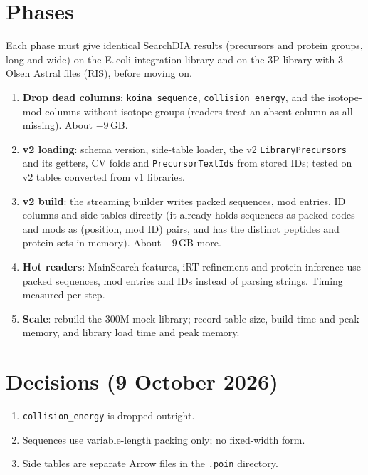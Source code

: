 \documentclass[10pt]{article}
\newcommand{\code}[1]{\texttt{#1}}
\begin{document}
\section{Phases}
Each phase must give identical SearchDIA results (precursors and protein groups, long and wide) on the E.\,coli
integration library and on the 3P library with 3 Olsen Astral files (RIS), before moving on.
\begin{enumerate}
\item \textbf{Drop dead columns}: \code{koina\_sequence}, \code{collision\_energy}, and the isotope-mod columns
  without isotope groups (readers treat an absent column as all missing). About $-9$\,GB.
\item \textbf{v2 loading}: schema version, side-table loader, the v2 \code{LibraryPrecursors} and its getters, CV
  folds and \code{PrecursorTextIds} from stored IDs; tested on v2 tables converted from v1 libraries.
\item \textbf{v2 build}: the streaming builder writes packed sequences, mod entries, ID columns and side tables
  directly (it already holds sequences as packed codes and mods as (position, mod ID) pairs, and has the distinct peptides
  and protein sets in memory). About $-9$\,GB more.
\item \textbf{Hot readers}: MainSearch features, iRT refinement and protein inference use packed sequences, mod
  entries and IDs instead of parsing strings.
  Timing measured per step.
\item \textbf{Scale}: rebuild the 300M mock library; record table size, build time and peak memory, and library load
  time and peak memory.
\end{enumerate}

\section{Decisions (9 October 2026)}
\begin{enumerate}
\item \code{collision\_energy} is dropped outright.
\item Sequences use variable-length packing only; no fixed-width form.
\item Side tables are separate Arrow files in the \code{.poin} directory.
\end{enumerate}
\end{document}
